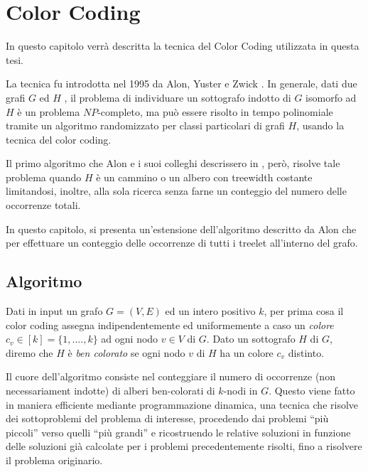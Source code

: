 \chapter{Color Coding}
\label{cap 2}
In questo capitolo verr\`a descritta la tecnica del Color Coding utilizzata in questa tesi.

La tecnica fu introdotta nel 1995 da Alon, Yuster e Zwick \cite{alon1995color}.
In generale, dati due grafi $G$ ed $ H $ , il problema di individuare un sottografo indotto di $ G $ isomorfo ad $ H $ \`e un problema $ NP $-completo, ma pu\`o essere risolto in tempo polinomiale tramite un algoritmo randomizzato per classi particolari di grafi $ H $, usando la tecnica del color coding.

Il primo algoritmo che Alon e i suoi colleghi descrissero in \cite{alon1995color} , per\`o, risolve tale problema quando $ H $ \`e un cammino o un albero con treewidth costante limitandosi, inoltre, alla sola ricerca senza farne un conteggio del numero delle occorrenze totali.
 
In questo capitolo, si presenta un'estensione dell'algoritmo descritto da Alon \cite{alon1995color,bressan2018motif} che per effettuare un conteggio delle occorrenze di tutti i treelet all'interno del grafo.\\




\section{Algoritmo}
\label{section1}

Dati in input un grafo $ G=(V,E) $ ed un intero positivo $ k $, per prima cosa il color coding assegna indipendentemente ed uniformemente a caso un \emph{colore}  $c_v \in [k] = \{1,....,k\} $ ad ogni nodo  $ v\in V $ di $ G $.
Dato un sottografo $H$ di $G$, diremo che $H$ è \emph{ben colorato} se ogni nodo $v$ di $H$ ha un colore $c_v$ distinto.

Il cuore dell'algoritmo consiste nel conteggiare il numero di occorrenze (non necessariament indotte) di alberi ben-colorati di $k$-nodi in $ G $.
Questo viene fatto in maniera efficiente mediante programmazione dinamica, una tecnica che risolve dei sottoproblemi del problema di interesse, procedendo dai problemi ``pi\`u piccoli'' verso quelli ``pi\`u grandi'' e ricostruendo le relative soluzioni in funzione delle soluzioni già calcolate per i problemi precedentemente risolti, fino a risolvere il problema originario.

